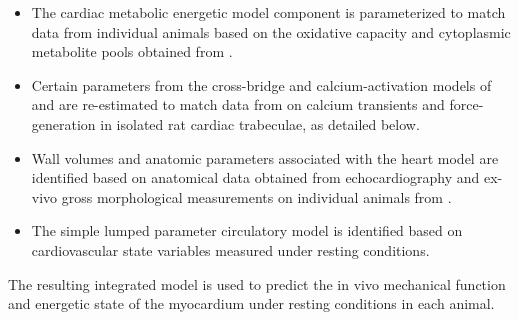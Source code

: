 \documentclass[fleqn,10pt]{physiome}
\begin{document}
\begin{itemize}

\item
The cardiac metabolic energetic model component is parameterized to match data from individual animals based on the oxidative capacity and cytoplasmic metabolite pools obtained from \cite{Lopez2020}. 

\item
Certain parameters from the cross-bridge and calcium-activation models of \cite{Tewari2016a,Tewari2016b} and \cite{Campbell2018} are re-estimated to match data from \cite{Janssen2002} on calcium transients and force-generation in isolated rat cardiac trabeculae, as detailed below.

\item
Wall volumes and anatomic parameters associated with the \cite{Lumens2009} heart model are identified based on anatomical data obtained from echocardiography and ex-vivo gross morphological measurements on individual animals from \cite{Lopez2020}.

\item
The simple lumped parameter circulatory model is identified based on cardiovascular state variables measured under resting conditions. 
\end{itemize}

The resulting integrated model is used to predict the in vivo mechanical function and energetic state of the myocardium under resting conditions in each animal. 
\end{document}
